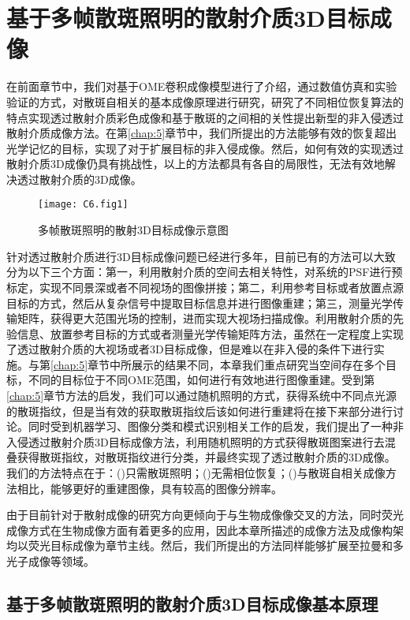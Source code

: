 
\chapter{基于多帧散斑照明的散射介质3D目标成像}

在前面章节中，我们对基于OME卷积成像模型进行了介绍，通过数值仿真和实验验证的方式，对散斑自相关的基本成像原理进行研究，研究了不同相位恢复算法的特点实现透过散射介质彩色成像和基于散斑的之间相的关性提出新型的非入侵透过散射介质成像方法。在第\ref{chap:5}章节中，我们所提出的方法能够有效的恢复超出光学记忆的目标，实现了对于扩展目标的非入侵成像。然后，如何有效的实现透过散射介质3D成像仍具有挑战性，以上的方法都具有各自的局限性，无法有效地解决透过散射介质的3D成像。

\begin{figure}[htp]
	\centering
	\texttt{[image: C6.fig1]}
	\caption{多帧散斑照明的散射3D目标成像示意图}
	\label{fig:6.1}
\end{figure}

针对透过散射介质进行3D目标成像问题已经进行多年，目前已有的方法可以大致分为以下三个方面：第一，利用散射介质的空间去相关特性，对系统的PSF进行预标定，实现不同景深或者不同视场的图像拼接；第二，利用参考目标或者放置点源目标的方式，然后从复杂信号中提取目标信息并进行图像重建；第三，测量光学传输矩阵，获得更大范围光场的控制，进而实现大视场扫描成像。利用散射介质的先验信息、放置参考目标的方式或者测量光学传输矩阵方法，虽然在一定程度上实现了透过散射介质的大视场或者3D目标成像，但是难以在非入侵的条件下进行实施。与第\ref{chap:5}章节中所展示的结果不同，本章我们重点研究当空间存在多个目标，不同的目标位于不同OME范围，如何进行有效地进行图像重建。受到第\ref{chap:5}章节方法的启发，我们可以通过随机照明的方式，获得系统中不同点光源的散斑指纹，但是当有效的获取散斑指纹后该如何进行重建将在接下来部分进行讨论。同时受到机器学习、图像分类和模式识别相关工作的启发，我们提出了一种非入侵透过散射介质3D目标成像方法，利用随机照明的方式获得散斑图案进行去混叠获得散斑指纹，对散斑指纹进行分类，并最终实现了透过散射介质的3D成像。我们的方法特点在于：()只需散斑照明；()无需相位恢复；()与散斑自相关成像方法相比，能够更好的重建图像，具有较高的图像分辨率。

由于目前针对于散射成像的研究方向更倾向于与生物成像像交叉的方法，同时荧光成像方式在生物成像方面有着更多的应用，因此本章所描述的成像方法及成像构架均以荧光目标成像为章节主线。然后，我们所提出的方法同样能够扩展至拉曼和多光子成像等领域。

\section{基于多帧散斑照明的散射介质3D目标成像基本原理}

